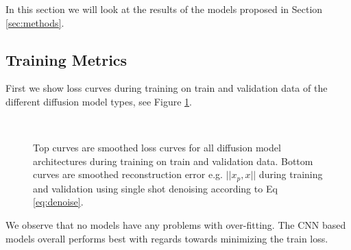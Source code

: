 
In this section we will look at the results of the models proposed in Section \ref{sec:methods}. 


\subsection{Training Metrics}
First we show loss curves during training on train and validation data of the different diffusion model types, see Figure \ref{fig:losscurvesall}.

\begin{figure}
    \centering
       \\


    \caption{Top curves are smoothed loss curves for all diffusion model architectures during training on train and validation data. Bottom curves are smoothed reconstruction error e.g. $||x_p,x||$ during training and validation using single shot denoising according to Eq \ref{eq:denoise}.}
    \label{fig:losscurvesall}
\end{figure}

We observe that no models have any problems with over-fitting. The CNN based models overall performs best with regards towards minimizing the train loss.

